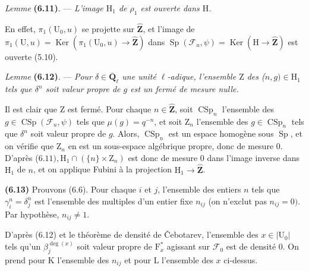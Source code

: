\documentclass[10pt,leqno]{article}
\begin{document}
\noindent \emph{Lemme} \textbf{(6.11)}. — {\itshape L’image \(\mathrm{H}_{1}\) de \(\rho _{1}\) est ouverte dans \(\mathrm{H}\).}\par

\noindent En effet, \(\pi _{1}(\mathrm{U}_{0},u)\) se projette sur \(\widehat{\mathbf{Z}}\), et l’image de \(\pi _{1}(\mathrm{U},u)=\operatorname{Ker}(\pi _{1}(\mathrm{U}_{0},u)\longrightarrow \widehat{\mathbf{Z}})\) dans \(\operatorname{Sp}(\mathcal{F} _{u},\psi )=\operatorname{Ker}(\mathrm{H}\longrightarrow \widehat{\mathbf{Z}})\) est ouverte (5.10).\par

\noindent \emph{Lemme} \textbf{(6.12)}. — {\itshape Pour \(\delta \in \overline{\mathbf{Q}}_{\ell }\) une unité \(\ell \)-adique, l’ensemble \(\mathrm{Z}\) des (\(n,g)\in \mathrm{H}_{1}\) tels que \(\delta ^{n}\) soit valeur propre de \(g\) est un fermé de mesure nulle.}\par

\noindent Il est clair que \(\mathrm{Z}\) est fermé. Pour chaque \(n\in \widehat{\mathbf{Z}}\), soit \(\operatorname{CSp}_{n}\) l’ensemble des \(g\in \operatorname{CSp}(\mathcal{F} _{u},\psi )\) tels que \(\mu (g)=q^{- n}\), et soit \(\mathrm{Z}_{n}\) l’ensemble des \(g\in \operatorname{CSp}_{n}\) tels que \(\delta ^{n}\) soit valeur propre de \(g\). Alors, \(\operatorname{CSp}_{n}\) est un espace homogène sous \(\operatorname{Sp}\), et on vérifie que \(\mathrm{Z}_{n}\) en est un sous-espace algébrique propre, donc de mesure 0. D’après (\(6.11), \mathrm{H}_{1}\cap (\{n\}\times \mathrm{Z}_{n})\) est donc de mesure 0 dans l’image inverse dans \(\mathrm{H}_{1}\) de \(n\), et on applique Fubini à la projection \(\mathrm{H}_{1}\longrightarrow \widehat{\mathbf{Z}}\).\par

\noindent \textbf{(6.13)} Prouvons (6.6). Pour chaque \(i\) et \(j\), l’ensemble des entiers \(n\) tels que \(\gamma _{i}^{n}=\delta _{j}^{n}\) est l’ensemble des multiples d’un entier fixe \(n_{ij}\) (on n’exclut pas \(n_{ij}=0)\). Par hypothèse, \(n_{ij}\ne 1\).\par

\noindent D’après (6.12) et le théorème de densité de Čebotarev, l’ensemble des \(x\in |\mathrm{U}_{0}|\) tels qu’un \(\beta _{j}^{\operatorname{deg}(x)}\) soit valeur propre de \(\mathrm{F}_{x}^{*}\) agissant sur \(\mathcal{F} _{0}\) est de densité 0. On prend pour \(\mathrm{K}\) l’ensemble des \(n_{ij}\) et pour \(\mathrm{L}\) l’ensemble des \(x\) ci-dessus.\par
\end{document}
